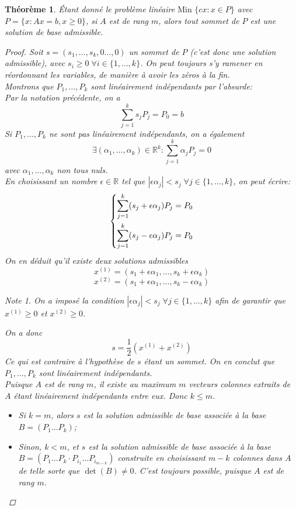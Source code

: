 \documentclass[a4paper]{report}
\theoremstyle{definition}
\theoremstyle{remark}
\newtheorem*{note}{Note}
\theoremstyle{plain}
\newtheorem{theorem}{Théorème}
\begin{document}
\begin{theorem}
\label{th:vertexIsBase}
Étant donné le problème linéaire \(\text{Min }\{cx:x\in P\}\) avec
\(P = \{x:Ax=b,x\ge 0\}\), si \(A\) est de rang \(m\), alors tout sommet de
\(P\) est une solution de base admissible.
\begin{proof}
Soit \(s=(s_1,\dots,s_k,0\dots,0)\) un sommet de \(P\) (c'est donc une solution
admissible), avec \(s_i\ge0\;\forall i\in\{1,\dots,k\}\). On peut toujours s'y ramener
en réordonnant les variables, de manière à avoir les zéros à la fin.\\
Montrons que \(P_1,\dots,P_k\) sont linéairement indépendants par l'absurde:\\
Par la notation précédente, on a
\[\sum_{j=1}^ks_jP_j=P_0=b\]
Si \(P_1,\dots,P_k\) ne sont pas linéairement indépendants, on a également
\[\exists (\alpha_1,\dots,\alpha_k)\in\mathbb{R}^k:\sum_{j=1}^k\alpha_jP_j=0\]
avec \(\alpha_1,\dots,\alpha_k\) non tous nuls.\\
En choisissant un nombre \(\epsilon\in\mathbb{R}\) tel que \(|\epsilon
\alpha_j|< s_j \;\forall j\in\{1,\dots,k\}\), on peut écrire:
\[\begin{dcases}
	\sum_{j=1}^k(s_j+\epsilon\alpha_j)P_j=P_0 \\
	\sum_{j=1}^k(s_j-\epsilon\alpha_j)P_j=P_0
\end{dcases}\]
On en déduit qu'il existe deux solutions admissibles
\[x^{(1)} = (s_1+\epsilon\alpha_1,\dots,s_k+\epsilon\alpha_k)\]
\[x^{(2)} = (s_1+\epsilon\alpha_1,\dots,s_k-\epsilon\alpha_k)\]
\begin{note}
On a imposé la condition \(|\epsilon \alpha_j|< s_j \;\forall j\in\{1,\dots,k\}\) afin
de garantir que \(x^{(1)}\ge0\) et \(x^{(2)}\ge0\).
\end{note}
On a donc
\[s=\frac{1}{2}(x^{(1)}+x^{(2)})\]
Ce qui est contraire à l'hypothèse de \(s\) étant un sommet. On en conclut que
\(P_1,\dots,P_k\) sont linéairement indépendants.\\
Puisque \(A\) est de rang \(m\), il existe au maximum \(m\) vecteurs colonnes
extraits de \(A\) étant linéairement indépendants entre eux. Donc \(k\le m\).
\begin{itemize}
	\item Si \(k=m\), alors \(s\) est la solution admissible de base associée à
	la base \(B=(P_1\dots P_k)\);
	\item Sinon, \(k<m\), et \(s\) est la solution admissible de base associée à
	la base \(B=(P_1\dots P_k\cdot P_{i_1}\dots P_{i_{m-k}})\)
	construite en choisissant \(m-k\) colonnes dans \(A\) de telle sorte que
	\(\det(B)\neq 0\). C'est toujours possible, puisque \(A\) est de rang \(m\).
\end{itemize}
\end{proof}
\end{theorem}
\end{document}
